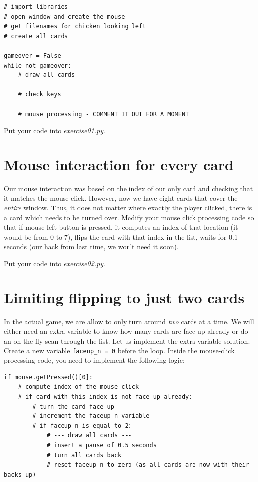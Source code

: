 \documentclass[
]{book}
\begin{document}
\begin{verbatim}
# import libraries
# open window and create the mouse
# get filenames for chicken looking left 
# create all cards

gameover = False
while not gameover:
    # draw all cards
    
    # check keys
    
    # mouse processing - COMMENT IT OUT FOR A MOMENT
\end{verbatim}

Put your code into \emph{exercise01.py}.

\hypertarget{mouse-interaction-for-every-card}{%
\section{Mouse interaction for every card}\label{mouse-interaction-for-every-card}}

Our mouse interaction was based on the index of our only card and checking that it matches the mouse click. However, now we have eight cards that cover the \emph{entire} window. Thus, it does not matter where exactly the player clicked, there is a card which needs to be turned over. Modify your mouse click processing code so that if mouse left button is pressed, it computes an index of that location (it would be from 0 to 7), flips the card with that index in the list, waits for 0.1 seconds (our hack from last time, we won't need it soon).

Put your code into \emph{exercise02.py}.

\hypertarget{limiting-flipping-to-just-two-cards}{%
\section{Limiting flipping to just two cards}\label{limiting-flipping-to-just-two-cards}}

In the actual game, we are allow to only turn around \emph{two} cards at a time. We will either need an extra variable to know how many cards are face up already or do an on-the-fly scan through the list. Let us implement the extra variable solution. Create a new variable \texttt{faceup\_n\ =\ 0} before the loop. Inside the mouse-click processing code, you need to implement the following logic:

\begin{verbatim}
if mouse.getPressed()[0]:
    # compute index of the mouse click
    # if card with this index is not face up already:
        # turn the card face up
        # increment the faceup_n variable
        # if faceup_n is equal to 2:
            # --- draw all cards ---
            # insert a pause of 0.5 seconds
            # turn all cards back
            # reset faceup_n to zero (as all cards are now with their backs up)
\end{verbatim}
\end{document}
